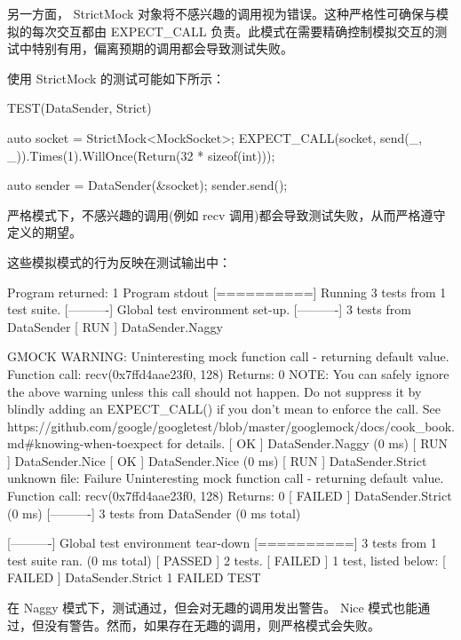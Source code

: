 
另一方面， StrictMock 对象将不感兴趣的调用视为错误。这种严格性可确保与模拟的每次交互都由 EXPECT\_CALL 负责。此模式在需要精确控制模拟交互的测试中特别有用，偏离预期的调用都会导致测试失败。

使用 StrictMock 的测试可能如下所示：

\begin{cpp}
TEST(DataSender, Strict) {
    auto socket = StrictMock<MockSocket>{};
    EXPECT_CALL(socket, send(_, _)).Times(1).WillOnce(Return(32 * sizeof(int)));

    auto sender = DataSender(&socket);
    sender.send();
}
\end{cpp}

严格模式下，不感兴趣的调用(例如 recv 调用)都会导致测试失败，从而严格遵守定义的期望。


这些模拟模式的行为反映在测试输出中：

\begin{shell}
Program returned: 1
Program stdout
[==========] Running 3 tests from 1 test suite.
[----------] Global test environment set-up.
[----------] 3 tests from DataSender
[ RUN      ] DataSender.Naggy

GMOCK WARNING:
Uninteresting mock function call - returning default value.
    Function call: recv(0x7ffd4aae23f0, 128)
        Returns: 0
NOTE: You can safely ignore the above warning unless this call should not happen. Do not suppress it by blindly adding an EXPECT_CALL() if you don't mean to enforce the call. See https://github.com/google/googletest/blob/master/googlemock/docs/cook_book.md#knowing-when-toexpect for details.
[       OK ] DataSender.Naggy (0 ms)
[ RUN      ] DataSender.Nice
[       OK ] DataSender.Nice (0 ms)
[ RUN      ] DataSender.Strict
unknown file: Failure
Uninteresting mock function call - returning default value.
    Function call: recv(0x7ffd4aae23f0, 128)
        Returns: 0
[ FAILED ] DataSender.Strict (0 ms)
[----------] 3 tests from DataSender (0 ms total)

[----------] Global test environment tear-down
[==========] 3 tests from 1 test suite ran. (0 ms total)
[  PASSED  ] 2 tests.
[  FAILED  ] 1 test, listed below:
[  FAILED  ] DataSender.Strict
1 FAILED TEST
\end{shell}

在 Naggy 模式下，测试通过，但会对无趣的调用发出警告。 Nice 模式也能通过，但没有警告。然而，如果存在无趣的调用，则严格模式会失败。

